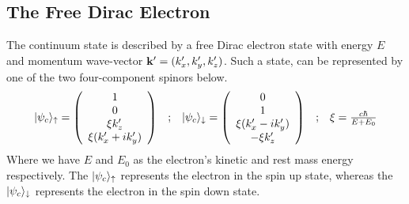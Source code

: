     \subsection{The Free Dirac Electron}
    The continuum state is described by a free Dirac electron state with energy $E$
    and momentum wave-vector $\mathbf{k'} = (k'_x,k'_y,k'_z)$. 
    Such a state, can be represented by one of the two four-component spinors below.
    \begin{equation}
    \begin{array}{ccccc}
        |\psi_c \rangle_{\uparrow} = 
        \left(
            \begin{array}{c}
                1                   \\
                0                   \\
                \xi k'_z            \\
                \xi (k'_x + ik'_y)
            \end{array}
        \right)
        & ; &
        |\psi_c \rangle_{\downarrow} = 
        \left(
            \begin{array}{c}
                0                   \\
                1                   \\
                \xi(k'_x - ik'_y)   \\
                -\xi k'_z
            \end{array}
        \right)
        & ; &
        \xi = \frac{c\hbar}{E + E_0}
    \end{array}
    \end{equation}
    Where we have $E$ and $E_0$ as the electron's kinetic and rest mass energy
    respectively.
    The $|\psi_c \rangle_{\uparrow}$ represents the electron in the spin up state,
    whereas the $|\psi_c \rangle_{\downarrow}$ represents the electron in the spin
    down state. 














